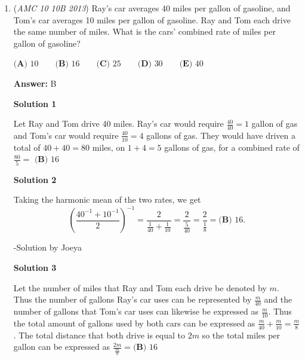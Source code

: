 \begin{enumerate}
\textbf{Solution 2}

As every point on the circle is evenly spaced, the length of each arc is $\frac{\pi}{3}$, because the circumference is $2\pi$. Once we draw the triangle (as is explained in solution 1), we see that one angle in the triangle subtends one such arc. Thus, the measure of that angle is thirty degrees. Similarly, another angle in the triangle subtends an arc of twice the length, and thus equals 60 degrees. The last angle is equal to 90 degrees and the triangle is a $30-60-90$ triangle. We know that as the diameter, the length of the hypotenuse is 2, and thus, the other sides are 1 and $\sqrt{3}$. We then find the area to be $\boxed{\textbf{(B) } \frac{\sqrt{3}}{2} }$.

 


	\item (\textit{AMC 10 10B 2013}) Ray's car averages 40 miles per gallon of gasoline, and Tom's car averages 10 miles per gallon of gasoline. Ray and Tom each drive the same number of miles. What is the cars' combined rate of miles per gallon of gasoline?


 $\textbf{(A) }10\qquad\textbf{(B) }16\qquad\textbf{(C) }25\qquad\textbf{(D) }30\qquad\textbf{(E) }40$

 \textbf{Answer: }B



\textbf{Solution 1}

Let Ray and Tom drive 40 miles. Ray's car would require $\frac{40}{40}=1$ gallon of gas and Tom's car would require $\frac{40}{10}=4$ gallons of gas. They would have driven a total of $40+40=80$ miles, on $1+4=5$ gallons of gas, for a combined rate of $\frac{80}{5}=$ $\boxed{\textbf{(B) }16}$




\textbf{Solution 2}

Taking the harmonic mean of the two rates, we get 
 \[\left(\frac{40^{-1} + 10^{-1}}{2}\right)^{-1} = \frac{2}{\frac{1}{40}+\frac{1}{10}} = \frac{2}{\frac{5}{40}} = \frac{2}{\frac{1}{8}} = \boxed{\textbf{(B) }16}.\]

 -Solution by Joeya

 



\textbf{Solution 3}

Let the number of miles that Ray and Tom each drive be denoted by $m$. Thus the number of gallons Ray's car uses can be represented by $\frac{m}{40}$ and the number of gallons that Tom's car uses can likewise be expressed as $\frac{m}{10}$. Thus the total amount of gallons used by both cars can be expressed as $\frac{m}{40} + \frac{m}{10} = \frac{m}{8}$. The total distance that both drive is equal to $2m$ so the total miles per gallon can be expressed as $\frac{2m}{\frac{m}{8}} = \boxed{\textbf{(B) }16}$




\end{enumerate}
